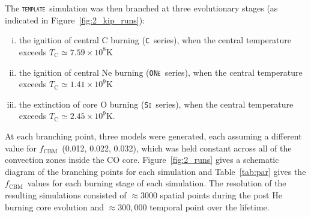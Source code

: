 \documentclass[useAMS,usenatbib]{mn2e}
\newcommand{\fcbm}{\ensuremath{f_\mathrm{CBM}}}
\newcommand{\template}{\textsc{\texttt{template}}}
\newcommand{\C}{\textsc{\texttt{C}}}
\newcommand{\ONe}{\textsc{\texttt{ONe}}}
\newcommand{\Si}{\textsc{\texttt{Si}}}
\newcommand{\num}[1]{{#1}}
\begin{document}
The \template\ simulation was then branched at three evolutionary stages
(as indicated in Figure~\ref{fig:2_kip_runs}):
\begin{enumerate}[(i)]
	\item the ignition of central C burning (\C\ series), when
		the central temperature exceeds $T_\mathrm{C}\simeq\num{7.59\times10^{8}}$K
	\item the ignition of central Ne burning (\ONe\ series), when
		the central temperature exceeds $T_\mathrm{C}\simeq\num{1.41\times10^{9}}$K
	\item the extinction of core O burning (\Si\ series), when the
		central temperature exceeds $T_\mathrm{C}\simeq\num{2.45\times10^{9}}$K.
\end{enumerate}
At each branching point, three models were generated, each assuming a different
value for \fcbm~(0.012, 0.022, 0.032), which was held constant across all
of the convection zones inside the CO core. Figure~\ref{fig:2_runs} gives a schematic diagram of the branching points for each simulation and Table~\ref{tab:par} gives the \fcbm~values for each burning stage of each simulation. The resolution of the resulting simulations consisted of $\approx 3000$ spatial points during the post He burning core evolution and $\approx 300,000$ temporal point over the lifetime.
\end{document}
